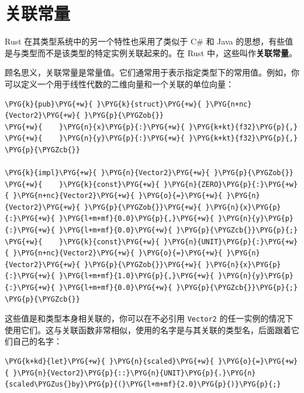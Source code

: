 \section{关联常量}

Rust 在其类型系统中的另一个特性也采用了类似于 C\# 和 Java 的思想，有些值是与类型而不是该类型的特定实例关联起来的。在 Rust 中，这些叫作\textbf{关联常量}。

顾名思义，关联常量是常量值。它们通常用于表示指定类型下的常用值。例如，你可以定义一个用于线性代数的二维向量和一个关联的单位向量：

\begin{Verbatim}[commandchars=\\\{\},breaklines=true,breakanywhere=true,fontsize=\codefont,xleftmargin=17bp]
\PYG{k}{pub}\PYG{+w}{ }\PYG{k}{struct}\PYG{+w}{ }\PYG{n+nc}{Vector2}\PYG{+w}{ }\PYG{p}{\PYGZob{}}
\PYG{+w}{    }\PYG{n}{x}\PYG{p}{:}\PYG{+w}{ }\PYG{k+kt}{f32}\PYG{p}{,}
\PYG{+w}{    }\PYG{n}{y}\PYG{p}{:}\PYG{+w}{ }\PYG{k+kt}{f32}\PYG{p}{,}
\PYG{p}{\PYGZcb{}}

\PYG{k}{impl}\PYG{+w}{ }\PYG{n}{Vector2}\PYG{+w}{ }\PYG{p}{\PYGZob{}}
\PYG{+w}{    }\PYG{k}{const}\PYG{+w}{ }\PYG{n}{ZERO}\PYG{p}{:}\PYG{+w}{ }\PYG{n+nc}{Vector2}\PYG{+w}{ }\PYG{o}{=}\PYG{+w}{ }\PYG{n}{Vector2}\PYG{+w}{ }\PYG{p}{\PYGZob{}}\PYG{+w}{ }\PYG{n}{x}\PYG{p}{:}\PYG{+w}{ }\PYG{l+m+mf}{0.0}\PYG{p}{,}\PYG{+w}{ }\PYG{n}{y}\PYG{p}{:}\PYG{+w}{ }\PYG{l+m+mf}{0.0}\PYG{+w}{ }\PYG{p}{\PYGZcb{}}\PYG{p}{;}
\PYG{+w}{    }\PYG{k}{const}\PYG{+w}{ }\PYG{n}{UNIT}\PYG{p}{:}\PYG{+w}{ }\PYG{n+nc}{Vector2}\PYG{+w}{ }\PYG{o}{=}\PYG{+w}{ }\PYG{n}{Vector2}\PYG{+w}{ }\PYG{p}{\PYGZob{}}\PYG{+w}{ }\PYG{n}{x}\PYG{p}{:}\PYG{+w}{ }\PYG{l+m+mf}{1.0}\PYG{p}{,}\PYG{+w}{ }\PYG{n}{y}\PYG{p}{:}\PYG{+w}{ }\PYG{l+m+mf}{0.0}\PYG{+w}{ }\PYG{p}{\PYGZcb{}}\PYG{p}{;}
\PYG{p}{\PYGZcb{}}
\end{Verbatim}

这些值是和类型本身相关联的，你可以在不必引用 \texttt{Vector2} 的任一实例的情况下使用它们。这与关联函数非常相似，使用的名字是与其关联的类型名，后面跟着它们自己的名字：

\begin{Verbatim}[commandchars=\\\{\},breaklines=true,breakanywhere=true,fontsize=\codefont,xleftmargin=17bp]
\PYG{k+kd}{let}\PYG{+w}{ }\PYG{n}{scaled}\PYG{+w}{ }\PYG{o}{=}\PYG{+w}{ }\PYG{n}{Vector2}\PYG{p}{::}\PYG{n}{UNIT}\PYG{p}{.}\PYG{n}{scaled\PYGZus{}by}\PYG{p}{(}\PYG{l+m+mf}{2.0}\PYG{p}{)}\PYG{p}{;}
\end{Verbatim}

